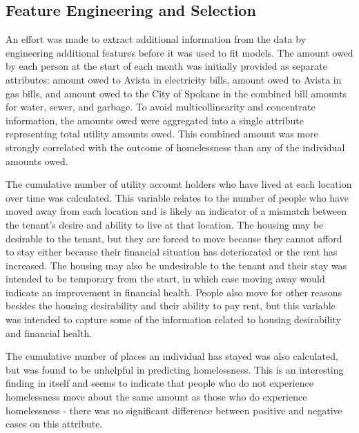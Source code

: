 \documentclass[utf8]{frontiersFPHY} %
\begin{document}
\subsection{Feature Engineering and Selection}
An effort was made to extract additional information from the data by engineering additional features before it was used to fit models. The amount owed by each person at the start of each month was initially provided as separate attributes: amount owed to Avista in electricity bills, amount owed to Avista in gas bills, and amount owed to the City of Spokane in the combined bill amounts for water, sewer, and garbage. To avoid multicollinearity and concentrate information, the amounts owed were aggregated into a single attribute representing total utility amounts owed. This combined amount was more strongly correlated with the outcome of homelessness than any of the individual amounts owed.

The cumulative number of utility account holders who have lived at each location over time was calculated. This variable relates to the number of people who have moved away from each location and is likely an indicator of a mismatch between the tenant's desire and ability to live at that location. The housing may be desirable to the tenant, but they are forced to move because they cannot afford to stay either because their financial situation has deteriorated or the rent has increased. The housing may also be undesirable to the tenant and their stay was intended to be temporary from the start, in which case moving away would indicate an improvement in financial health. People also move for other reasons besides the housing desirability and their ability to pay rent, but this variable was intended to capture some of the information related to housing desirability and financial health.

The cumulative number of places an individual has stayed was also calculated, but was found to be unhelpful in predicting homelessness. This is an interesting finding in itself and seems to indicate that people who do not experience homelessness move about the same amount as those who do experience homelessness - there was no significant difference between positive and negative cases on this attribute.
\end{document}
